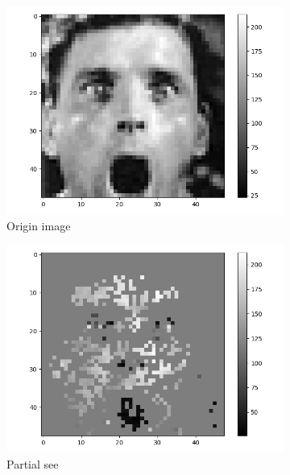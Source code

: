 \documentclass[12pt,a4paper]{extarticle}
\begin{document}
\begin{enumerate}
  \begin{figure}[ht]
    \begin{subfigure}[t]{0.32\textwidth}
      \centering
      \includegraphics[width=\linewidth]{images/origin-29.png}
      \caption{Origin image}
      \label{fig:origin-29}
    \end{subfigure}
    \begin{subfigure}[t]{0.32\textwidth}
      \centering
      \includegraphics[width=\linewidth]{images/partial-29.png}
      \caption{Partial see}
      \label{fig:partial-29}
    \end{subfigure}
    \begin{subfigure}[t]{0.32\textwidth}
      \centering

\end{subfigure}
\end{figure}
\end{enumerate}
\end{document}

